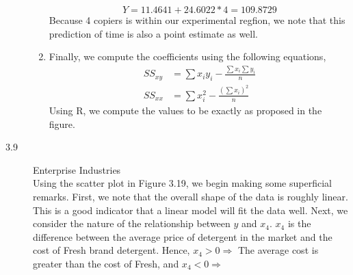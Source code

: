 \documentclass[letterpaper,10pt]{article}
\begin{document}
\begin{description}
\begin{enumerate}[label=\alph*.]
\[Y=11.4641+24.6022*4=109.8729\]
Because 4 copiers is within our experimental regfion, we note that this prediction of time is also a point estimate as well.
\item Finally, we compute the coefficients using the following equations,
\begin{align*}
SS_{xy}&=\sum x_iy_i-\frac{\sum x_i\sum y_i}{n}\\
SS_{xx}&=\sum x_i^2-\frac{(\sum x_i)^2}{n}
\end{align*}
Using R, we compute the values to be exactly as proposed in the figure.
\end{enumerate}
\item[3.9] Enterprise Industries\\
Using the scatter plot in Figure 3.19, we begin making some superficial remarks. First, we note that the overall shape of the data is roughly linear. This is a good indicator that a linear model will fit the data well. Next, we consider the nature of the relationship between $y$ and $x_4$. $x_4$ is the difference between the average price of detergent in the market and the cost of Fresh brand detergent. Hence, $x_4>0\Rightarrow$ The average cost is greater than the cost of Fresh, and $x_4<0\Rightarrow$ 
\end{description}
\end{document}
